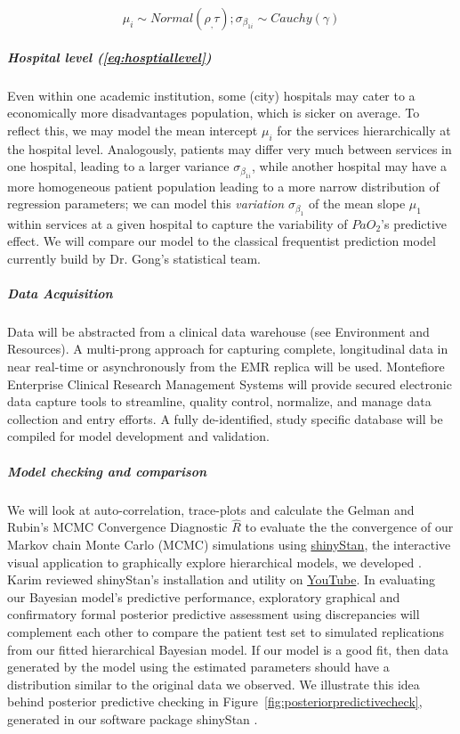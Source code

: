 \documentclass[11pt,notitlepage]{article}
\begin{document}
\begin{figure}
\vspace{-10pt}
\begin{equation} \label{eq:hosptiallevel}
 \mu_i \sim Normal(\rho_, \tau); \sigma_{\beta_{1i}} \sim Cauchy(\gamma)
\end{equation}
\vspace{-25pt}
\end{figure}

\subparagraph*{Hospital level (\ref{eq:hosptiallevel})}
Even within one academic institution, some (city) hospitals may cater to a economically more disadvantages population, which is sicker on average. To reflect this, we may  model the mean intercept $\mu_i$ for the services hierarchically at the hospital level. Analogously, patients may differ very much between services in one hospital, leading to a larger variance $\sigma_{\beta_{1i}}$, while another hospital may have a more homogeneous patient population leading to a more narrow distribution of regression parameters; we can model this \textit{variation} $\sigma_{\beta_1}$ of the mean slope $\mu_1$ within services at a given hospital to capture the variability of $PaO_2$'s predictive effect. We will compare our model to the classical frequentist prediction model currently build by Dr. Gong's statistical team.

\subparagraph*{Data Acquisition}
Data will be abstracted from a clinical data warehouse (see Environment and Resources). A multi-prong approach for capturing complete, longitudinal data in near real-time or asynchronously from the EMR replica will be used. Montefiore Enterprise Clinical Research Management Systems will provide secured electronic data capture tools to streamline, quality control, normalize, and manage data collection and entry efforts. A fully de-identified, study specific database will be compiled for model development and validation.

\subparagraph*{Model checking and comparison}
We will look at auto-correlation, trace-plots and calculate the Gelman and Rubin's MCMC Convergence Diagnostic $ \hat{R}$ to evaluate the the convergence of our Markov chain Monte Carlo (MCMC) simulations using \href{http://andrewgelman.com/2015/03/02/introducing-shinystan/}{shinyStan}, the interactive visual application to graphically explore hierarchical models, we developed \cite{shinystan-software:2015}. Karim reviewed shinyStan's installation and utility on \href{https://www.youtube.com/watch?v=X31xqNHcvQs}{YouTube}. In evaluating our Bayesian model's predictive performance, exploratory graphical \cite{Gelman2004posteriorpredictivechecks} and confirmatory formal posterior predictive assessment using discrepancies \cite{GelmanMengStern1996} will complement each other to compare the patient test set to simulated replications from our fitted hierarchical Bayesian model. If our model is a good fit, then data generated by the model using the estimated parameters should have a distribution similar to the original data we observed. We illustrate this idea behind posterior predictive checking \cite{Gelman_predictive_2000} in Figure~\ref{fig:posteriorpredictivecheck}, generated in our software package shinyStan \cite{shinystan-software:2015}.
\end{document}
